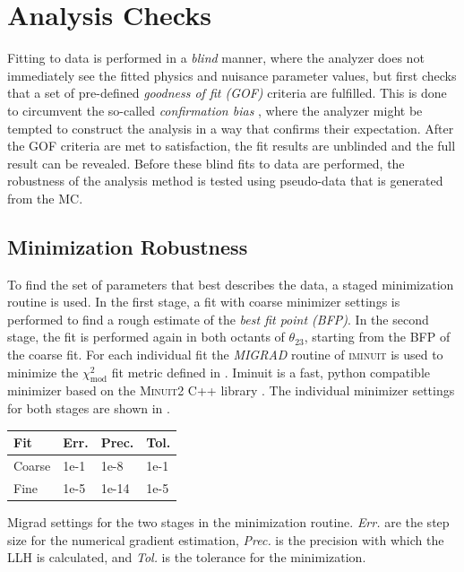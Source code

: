 \section{Analysis Checks}

Fitting to data is performed in a \textit{blind} manner, where the analyzer does not immediately see the fitted physics and nuisance parameter values, but first checks that a set of pre-defined \textit{goodness of fit (GOF)} criteria are fulfilled. This is done to circumvent the so-called \textit{confirmation bias} , where the analyzer might be tempted to construct the analysis in a way that confirms their expectation. After the GOF criteria are met to satisfaction, the fit results are unblinded and the full result can be revealed. Before these blind fits to data are performed, the robustness of the analysis method is tested using pseudo-data that is generated from the MC.


\subsection{Minimization Robustness} 

To find the set of parameters that best describes the data, a staged minimization routine is used. In the first stage, a fit with coarse minimizer settings is performed to find a rough estimate of the \textit{best fit point (BFP)}. In the second stage, the fit is performed again in both octants of $\theta_{23}$, starting from the BFP of the coarse fit. For each individual fit the \textit{MIGRAD} routine of \textsc{iminuit}  is used to minimize the $\chi^2_{\mathrm{mod}}$ fit metric defined in . Iminuit is a fast, python compatible minimizer based on the \textsc{Minuit2} C++ library . The individual minimizer settings for both stages are shown in .

\begin{margintable}
    \small
        \begin{tabular}{ llll }
        \hline\hline
        \textbf{Fit} & \textbf{Err.} & \textbf{Prec.} & \textbf{Tol.} \\
        \hline\hline
        Coarse & 1e-1 & 1e-8 & 1e-1 \\
        Fine & 1e-5 & 1e-14 & 1e-5 \\
        \hline
        \end{tabular}
    \caption[Staged minimization routine settings]{Migrad settings for the two stages in the minimization routine. \textit{Err.} are the step size for the numerical gradient estimation, \textit{Prec.} is the precision with which the LLH is calculated, and \textit{Tol.} is the tolerance for the minimization.}
\end{margintable}

